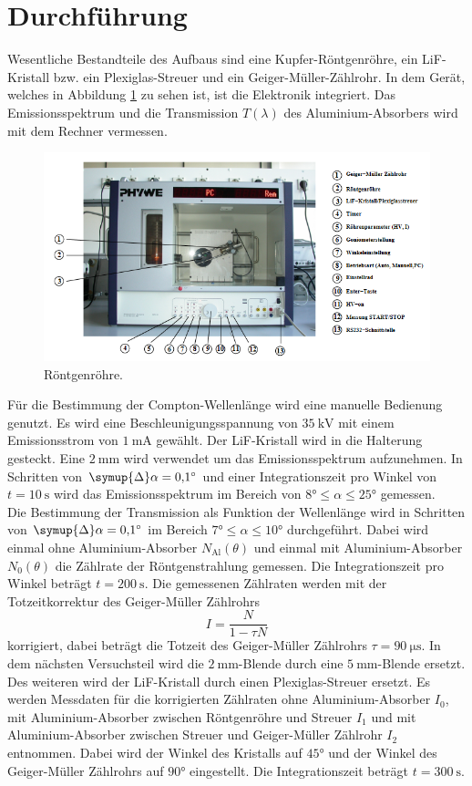 \section{Durchführung}
\label{sec:Durchführung}
Wesentliche Bestandteile des Aufbaus sind eine Kupfer-Röntgenröhre, ein LiF-Kristall bzw. ein Plexiglas-Streuer und ein Geiger-Müller-Zählrohr.
In dem Gerät, welches in Abbildung \ref{fig:rön} zu sehen ist, ist die Elektronik integriert. Das Emissionsspektrum und die Transmission $T(\lambda)$ des Aluminium-Absorbers wird mit dem Rechner vermessen.
\begin{figure}
    \centering
    \caption{Röntgenröhre.\cite{V603}}
    \label{fig:rön}
    \includegraphics[width = 0.6 \textwidth]{pics/röntgenröhre.png}
\end{figure}
Für die Bestimmung der Compton-Wellenlänge wird eine manuelle Bedienung genutzt. Es wird eine Beschleunigungsspannung von $\SI{35}{\kilo \volt}$ mit einem Emissionsstrom von $\SI{1}{\milli \ampere}$ gewählt.
Der LiF-Kristall wird in die Halterung gesteckt. Eine $\SI{2}{\milli \metre}$ wird verwendet um das Emissionsspektrum aufzunehmen. In Schritten von $\symup{\Delta}\alpha=\ang{0.1;;}$ und einer Integrationszeit pro Winkel von $t=\SI{10}{\second}$
wird das Emissionsspektrum im Bereich von $\ang{8;;} \leq \alpha \leq \ang{25;;}$ gemessen. 
\\
Die Bestimmung der Transmission als Funktion der Wellenlänge wird in Schritten von $\symup{\Delta}\alpha=\ang{0.1;;}$ im Bereich $\ang{7;;} \leq \alpha \leq \ang{10;;}$ durchgeführt.
Dabei wird einmal ohne Aluminium-Absorber $N_\text{Al}(\theta)$ und einmal mit Aluminium-Absorber $N_0(\theta)$ die Zählrate der Röntgenstrahlung gemessen. Die Integrationszeit pro Winkel beträgt
$t=\SI{200}{\second}$. Die gemessenen Zählraten werden mit der Totzeitkorrektur des Geiger-Müller Zählrohrs
\begin{equation}
    I=\frac{N}{1-\tau N}
    \label{eqn:tot}
\end{equation}
korrigiert, dabei beträgt die Totzeit des Geiger-Müller Zählrohrs $\tau=\SI{90}{\micro \second}$.
In dem nächsten Versuchsteil wird die $\SI{2}{\milli \metre}$-Blende durch eine $\SI{5}{\milli \metre}$-Blende ersetzt. Des weiteren wird der LiF-Kristall
durch einen Plexiglas-Streuer ersetzt. Es werden Messdaten für die korrigierten Zählraten ohne Aluminium-Absorber $I_0$, mit Aluminium-Absorber zwischen Röntgenröhre und Streuer $I_1$ und mit Aluminium-Absorber zwischen Streuer und Geiger-Müller Zählrohr $I_2$ entnommen.
Dabei wird der Winkel des Kristalls auf $\ang{45;;}$ und der Winkel des Geiger-Müller Zählrohrs auf $\ang{90;;}$ eingestellt. Die Integrationszeit beträgt $t=\SI{300}{\second}$.